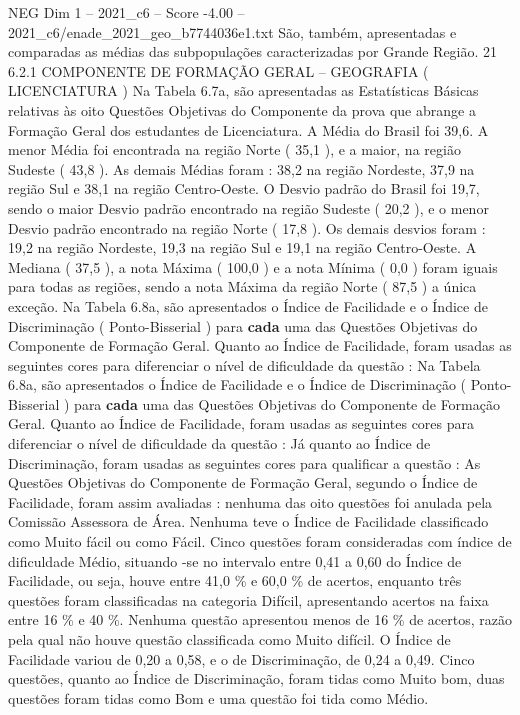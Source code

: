 \begin{textsample}{NEG Dim 1 – 2021\_c6 – Score -4.00 – 2021\_c6/enade\_2021\_geo\_b7744036e1.txt}
São, também, apresentadas e comparadas as médias das subpopulações caracterizadas por Grande Região. 21 6.2.1 COMPONENTE DE FORMAÇÃO GERAL – GEOGRAFIA ( LICENCIATURA ) Na Tabela 6.7a, são apresentadas as Estatísticas Básicas relativas às oito Questões Objetivas do Componente da prova que abrange a Formação Geral dos estudantes de Licenciatura.
A Média do Brasil foi 39,6.
A menor Média foi encontrada na região Norte ( 35,1 ), e a maior, na região Sudeste ( 43,8 ).
As demais Médias foram : 38,2 na região Nordeste, 37,9 na região Sul e 38,1 na região Centro-Oeste.
O Desvio padrão do Brasil foi 19,7, sendo o maior Desvio padrão encontrado na região Sudeste ( 20,2 ), e o menor Desvio padrão encontrado na região Norte ( 17,8 ).
Os demais desvios foram : 19,2 na região Nordeste, 19,3 na região Sul e 19,1 na região Centro-Oeste.
A Mediana ( 37,5 ), a nota Máxima ( 100,0 ) e a nota Mínima ( 0,0 ) foram iguais para todas as regiões, sendo a nota Máxima da região Norte ( 87,5 ) a única exceção.
Na Tabela 6.8a, são apresentados o Índice de Facilidade e o Índice de Discriminação ( Ponto-Bisserial ) para \textbf{cada} uma das Questões Objetivas do Componente de Formação Geral.
Quanto ao Índice de Facilidade, foram usadas as seguintes cores para diferenciar o nível de dificuldade da questão : Na Tabela 6.8a, são apresentados o Índice de Facilidade e o Índice de Discriminação ( Ponto-Bisserial ) para \textbf{cada} uma das Questões Objetivas do Componente de Formação Geral.
Quanto ao Índice de Facilidade, foram usadas as seguintes cores para diferenciar o nível de dificuldade da questão : Já quanto ao Índice de Discriminação, foram usadas as seguintes cores para qualificar a questão : As Questões Objetivas do Componente de Formação Geral, segundo o Índice de Facilidade, foram assim avaliadas : nenhuma das oito questões foi anulada pela Comissão Assessora de Área.
Nenhuma teve o Índice de Facilidade classificado como Muito fácil ou como Fácil.
Cinco questões foram consideradas com índice de dificuldade Médio, situando -se no intervalo entre 0,41 a 0,60 do Índice de Facilidade, ou seja, houve entre 41,0 \% e 60,0 \% de acertos, enquanto três questões foram classificadas na categoria Difícil, apresentando acertos na faixa entre 16 \% e 40 \%.
Nenhuma questão apresentou menos de 16 \% de acertos, razão pela qual não houve questão classificada como Muito difícil.
O Índice de Facilidade variou de 0,20 a 0,58, e o de Discriminação, de 0,24 a 0,49.
Cinco questões, quanto ao Índice de Discriminação, foram tidas como Muito bom, duas questões foram tidas como Bom e uma questão foi tida como Médio.

\end{textsample}
